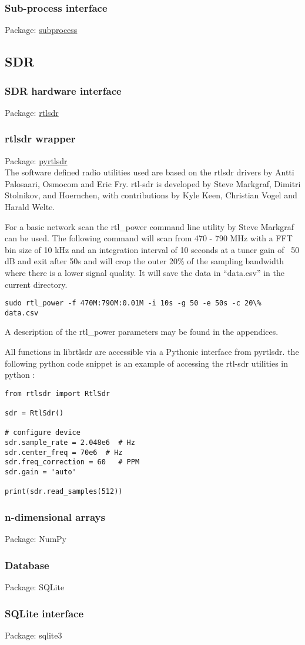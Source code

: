 \subsubsection{Sub-process interface}
Package:	\href{https://docs.python.org/2/library/subprocess.html}{subprocess}\\

\subsection{SDR}
\subsubsection{SDR hardware interface}
Package:	\href{https://github.com/steve-m/librtlsdr}{rtlsdr}\\

\subsubsection{rtlsdr wrapper}
Package:	\href{https://github.com/roger-/pyrtlsdr}{pyrtlsdr}\\
The software defined radio utilities used are based on the rtlsdr drivers by Antti Palosaari, Osmocom and Eric Fry. rtl-sdr is developed by Steve Markgraf, Dimitri Stolnikov, and Hoernchen, with contributions by Kyle Keen, Christian Vogel and Harald Welte.

For a basic network scan the rtl\_power command line utility by Steve Markgraf can be used. The following command will scan from 470 - 790 MHz with a FFT bin size of 10 kHz and an integration interval of 10 seconds at a tuner gain of ~50 dB and exit after 50s and will crop the outer 20\% of the sampling bandwidth where there is a lower signal quality. It will save the data in “data.csv” in the current directory.
\begin{lstlisting}
sudo rtl_power -f 470M:790M:0.01M -i 10s -g 50 -e 50s -c 20\%  data.csv
\end{lstlisting}

A description of the rtl_power parameters may be found in the appendices.

All functions in librtlsdr are accessible via a Pythonic interface from pyrtlsdr.
the following python code snippet is an example of accessing the rtl-sdr utilities in python :

\begin{lstlisting}
from rtlsdr import RtlSdr

sdr = RtlSdr()

# configure device
sdr.sample_rate = 2.048e6  # Hz
sdr.center_freq = 70e6 	# Hz
sdr.freq_correction = 60   # PPM
sdr.gain = 'auto'

print(sdr.read_samples(512))
\end{lstlisting}

\subsubsection{n-dimensional arrays}
Package:	NumPy

\subsubsection{Database}
Package:	SQLite

\subsubsection{SQLite interface}
Package:	sqlite3
    
    
    